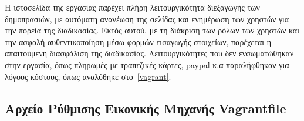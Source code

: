 \documentclass[12pt]{report}
\begin{document}
Η ιστοσελίδα της εργασίας παρέχει πλήρη λειτουργικότητα διεξαγωγής των δημοπρασιών, με αυτόματη ανανέωση της σελίδας και ενημέρωση των χρηστών για την πορεία της διαδικασίας. Εκτός αυτού, με τη διάκριση των ρόλων των χρηστών και την ασφαλή αυθεντικοποίηση μέσω φορμών εισαγωγής στοιχείων, παρέχεται η απαιτούμενη διασφάλιση της διαδικασίας. Λειτουργικότητες που δεν ενσωματώθηκαν στην εργασία, όπως πληρωμές με τραπεζικές κάρτες, \textlatin{paypal} κ.α παραλήφθηκαν για λόγους κόστους, όπως αναλύθηκε στο~\ref{vagrant}.


\begin{appendices}
\chapter{Αρχείο Ρύθμισης Εικονικής Μηχανής \textlatin{Vagrantfile}}\label{AppA}
\inputminted[linenos, fontsize=\scriptsize, breaklines, baselinestretch=1]{ruby}{sources/Vagrantfile}
\end{appendices}

\appendix



\end{document}
